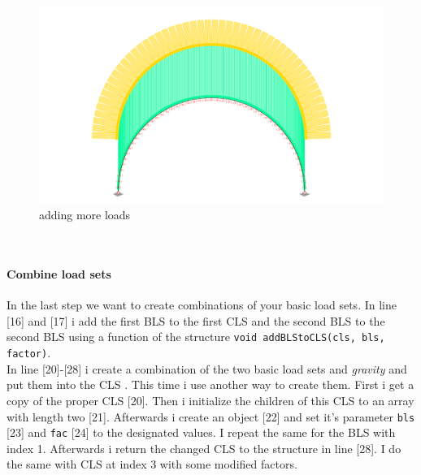 \hfill
\begin{minipage}[h]{8cm}
\begin{figure}[H]
\begin{center}
\includegraphics[width=\textwidth-1cm]{../pictures/scriptmoreload.png}
\caption{adding more loads}
\label{pic:scriptmoreload}
\end{center}
\end{figure}
\end{minipage}
\vspace{20pt}\\
\begin{minipage}[h]{\textwidth-8cm}
\paragraph{Combine load sets} In the last step we want to create combinations of your basic load sets. In line [16] and [17] i add the first BLS to the first CLS and the second BLS to the second BLS using a function of the structure \texttt{void addBLStoCLS(cls, bls, factor)}.\\
In line [20]-[28] i create a combination of the two basic load sets  and \textit{gravity} and put them into the CLS . This time i use another way to create them. First i get a copy of the proper CLS [20]. Then i initialize the children of this CLS to an array with length two [21]. Afterwards i create an object [22] and set it's parameter \texttt{bls} [23] and \texttt{fac} [24] to the designated values. I repeat the same for the BLS with index 1. Afterwards i return the changed CLS to the structure in line [28]. I do the same with CLS at index 3 with some modified factors.
\end{minipage}
\hfill
